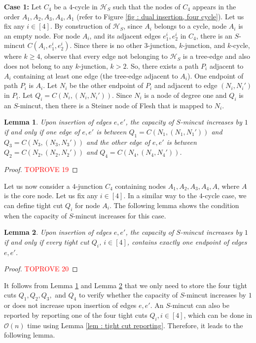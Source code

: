 \documentclass[letterpaper,11pt]{article}
\newtheorem{lemma}{Lemma}[]
\begin{document}
\noindent
\textbf{Case 1:} Let $C_4$ be a $4$-cycle in ${\mathcal H}_S$ such that the nodes of $C_4$ appears in the order $A_1,A_2,A_3,A_4,A_1$ (refer to Figure \ref{fig : dual insertion, four cycle}). Let us fix any $i\in [4]$. By construction of ${\mathcal H}_S$, since $A_i$ belongs to a cycle, node $A_i$ is an empty node. For node $A_i$, and its adjacent edges $e_1^i,e_2^i$ in $C_4$, there is an $S$-mincut $C(A_i,e_1^i,e_2^i)$. Since there is no other $3$-junction, $k$-junction, and $k$-cycle, where $k\ge 4$, observe that every edge not belonging to ${\mathcal H}_S$ is a tree-edge and also does not belong to any $k$-junction, $k>2$. So, there exists a path $P_i$ adjacent to $A_i$ containing at least one edge (the tree-edge adjacent to $A_i$). One endpoint of path $P_i$ is $A_i$. Let $N_i$ be the other endpoint of $P_i$ and adjacent to edge $(N_i,N_i')$ in $P_i$. Let $Q_i=C(N_i,(N_i,N_i'))$. Since $N_i$ is a node of degree one and $Q_i$ is an $S$-mincut, then there is a Steiner node of Flesh that is mapped to $N_i$. 
\begin{lemma} \label{lem : 4 cycle insertions}
    Upon insertion of edges $e,e'$, the capacity of $S$-mincut increases by $1$ if and only if one edge of $e,e'$ is between $Q_1=C(N_1,(N_1,N_1'))$ and $Q_3=C(N_3,(N_3,N_3'))$ and the other edge of $e,e'$ is between $Q_2=C(N_2,(N_2,N_2'))$ and $Q_4=C(N_4,(N_4,N_4'))$. 
\end{lemma}
\begin{proof}\textcolor{red}{TOPROVE 19}\end{proof}
Let us now consider a $4$-junction $C_4$ containing nodes $A_1,A_2,A_3,A_4,A$, where $A$ is the core node. Let us fix any $i\in[4]$. In a similar way to the $4$-cycle case, we can define tight cut $Q_i$ for node $A_i$. The following lemma shows the condition when the capacity of $S$-mincut increases for this case.
\begin{lemma} \label{lem : 4 junction insertions}
    Upon insertion of edges $e,e'$, the capacity of $S$-mincut increases by $1$ if and only if every tight cut $Q_i$, $i\in [4]$, contains exactly one endpoint of edges $e,e'$.
\end{lemma}
\begin{proof}\textcolor{red}{TOPROVE 20}\end{proof}
It follows from Lemma \ref{lem : 4 cycle insertions} and Lemma \ref{lem : 4 junction insertions} that we only need to store the four tight cuts $Q_1,Q_2,Q_3,$ and $Q_4$ to verify whether the capacity of $S$-mincut increases by $1$ or does not increase upon insertion of edges $e,e'$. An $S$-mincut can also be reported by reporting one of the four tight cuts $Q_i, i\in [4]$, which can be done in ${\mathcal O}(n)$ time using Lemma \ref{lem : tight cut reporting}. Therefore, it leads to the following lemma.
\end{document}
